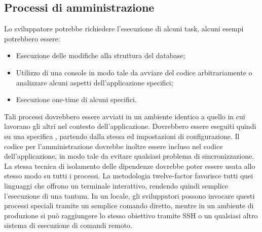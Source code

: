 \documentclass[NormeDiProgetto.tex]{subfiles}
\begin{document}
\subsection{Processi di amministrazione}
Lo sviluppatore potrebbe richiedere l'esecuzione di alcuni task, alcuni esempi potrebbero essere:
\begin{itemize}
\item Esecuzione delle modifiche alla struttura del database;
\item Utilizzo di una console in modo tale da avviare del codice arbitrariamente o analizzare alcuni aspetti dell'applicazione specifici;
\item Esecuzione one-time di alcuni  specifici.
\end{itemize}
Tali processi dovrebbero essere avviati in un ambiente identico a quello in cui lavorano gli altri nel contesto dell'applicazione. Dovrebbero essere eseguiti quindi su una specifica , partendo dalla stessa  ed impostazioni di configurazione. Il codice per l'amministrazione dovrebbe inoltre essere incluso nel codice dell'applicazione, in modo tale da evitare qualsiasi problema di sincronizzazione.
La stessa tecnica di isolamento delle dipendenze dovrebbe poter essere usata allo stesso modo su tutti i processi.
La metodologia twelve-factor favorisce tutti quei linguaggi che offrono un terminale interattivo, rendendo quindi semplice l'esecuzione di  una tantum. In un  locale, gli sviluppatori possono invocare questi processi speciali tramite un semplice comando diretto, mentre in un ambiente di produzione si può raggiungere lo stesso obiettivo tramite SSH o un qualsiasi altro sistema di esecuzione di comandi remoto.
\end{document}

